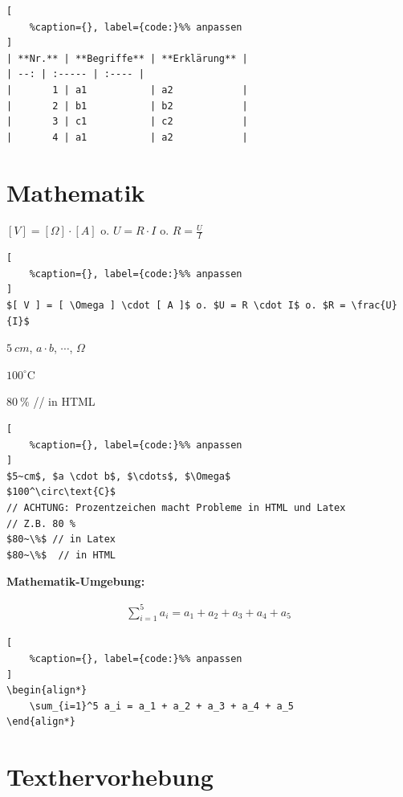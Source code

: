 \lstset{language=Python}%
\begin{lstlisting}[
	%caption={}, label={code:}%% anpassen
]
| **Nr.** | **Begriffe** | **Erklärung** |
| --: | :----- | :---- |
|       1 | a1           | a2            |
|       2 | b1           | b2            |
|       3 | c1           | c2            |
|       4 | a1           | a2            |
\end{lstlisting}

\section{Mathematik}\label{mathematik}

$[ V ] = [ \Omega ] \cdot [ A ]$ o. $U = R \cdot I$ o.
$R = \frac{U}{I}$

\lstset{language=Python}%
\begin{lstlisting}[
	%caption={}, label={code:}%% anpassen
]
$[ V ] = [ \Omega ] \cdot [ A ]$ o. $U = R \cdot I$ o. $R = \frac{U}{I}$
\end{lstlisting}

$5~cm$, $a \cdot b$, $\cdots$, $\Omega$

$100^\circ\text{C}$

$80~\%$ // in HTML

\lstset{language=Python}%
\begin{lstlisting}[
	%caption={}, label={code:}%% anpassen
]
$5~cm$, $a \cdot b$, $\cdots$, $\Omega$
$100^\circ\text{C}$  
// ACHTUNG: Prozentzeichen macht Probleme in HTML und Latex 
// Z.B. 80 %
$80~\%$ // in Latex
$80~\%$  // in HTML
\end{lstlisting}

\textbf{Mathematik-Umgebung:}

\begin{align*}
    \sum_{i=1}^5 a_i = a_1 + a_2 + a_3 + a_4 + a_5
\end{align*}

\lstset{language=Python}%
\begin{lstlisting}[
	%caption={}, label={code:}%% anpassen
]
\begin{align*}
    \sum_{i=1}^5 a_i = a_1 + a_2 + a_3 + a_4 + a_5
\end{align*}
\end{lstlisting}

\section{Texthervorhebung}\label{texthervorhebung}

